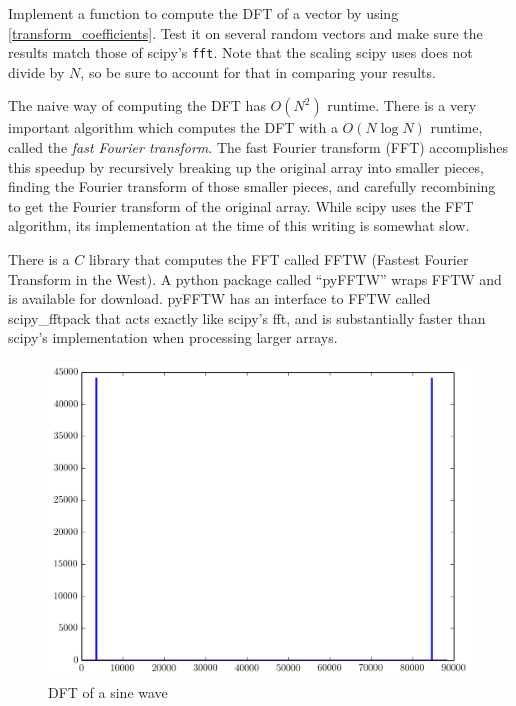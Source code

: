 \begin{problem}
Implement a function to compute the DFT of a vector by using \eqref{transform_coefficients}. %
Test it on several random vectors and make sure the results match those of scipy's \texttt{fft}.  
Note that the scaling scipy uses does not divide by $N$, so be sure to account for that in comparing your results.
\end{problem}

The naive way of computing the DFT has $O(N^2)$ runtime.   
There is a very important algorithm which computes the DFT with a $O(N \log N)$ runtime, called the \emph{fast Fourier transform}. 
The fast Fourier transform (FFT) accomplishes this speedup by recursively breaking up the original array into smaller pieces, finding the Fourier transform of those smaller pieces, and carefully recombining to get the Fourier transform of the original array.  
While scipy uses the FFT algorithm, its implementation at the time of this writing is somewhat slow.

There is a $C$ library that computes the FFT called FFTW (Fastest Fourier Transform in the West).  
A python package called ``pyFFTW'' wraps FFTW and is available for download. 
pyFFTW  has an interface to FFTW called scipy\_fftpack that acts exactly like scipy's fft, and is substantially faster than scipy's implementation when processing larger arrays. 


\begin{figure}[ht]\caption{DFT of a sine wave}\label{sinespec}\centering\includegraphics[width=\textwidth]{sinespec}\end{figure}

